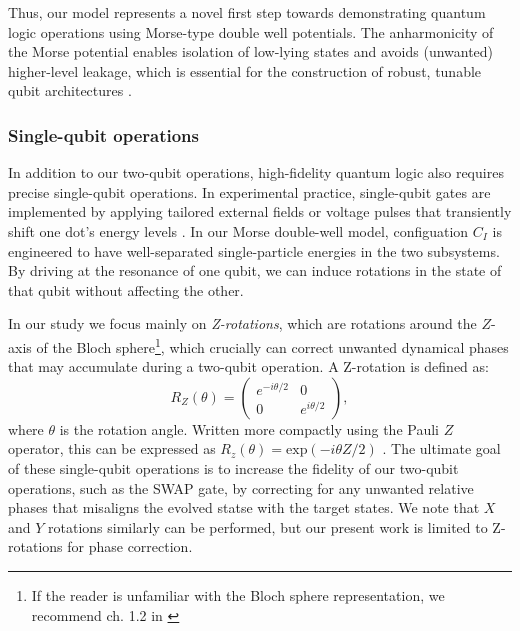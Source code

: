 \documentclass{subfiles}
\begin{document}
Thus, our model represents a novel first step towards demonstrating quantum logic operations using Morse-type double well potentials. The anharmonicity of the Morse potential enables isolation of low-lying states and avoids (unwanted) higher-level leakage, which is essential for the construction of robust, tunable qubit architectures \cite{nielsen2010quantum}.

\subsubsection*{Single-qubit operations}
In addition to our two-qubit operations, high-fidelity quantum logic also requires precise single-qubit operations.  In experimental practice, single-qubit gates are implemented by applying tailored external fields or voltage pulses that transiently shift one dot's energy levels \cite{mcdermott2014accurate}. In our Morse double-well model, configuation $C_I$ is engineered to have well-separated single-particle energies in the two subsystems. By driving at the resonance of one qubit, we can induce rotations in the state of that qubit without affecting the other. 

In our study we focus mainly on \emph{Z-rotations}, which are rotations around the $Z$-axis of the Bloch sphere\footnote{If the reader is unfamiliar with the Bloch sphere representation, we recommend ch. 1.2 in \cite{nielsen2010quantum}}, which crucially can correct unwanted dynamical phases that may accumulate during a two-qubit operation. A Z-rotation is defined as:
\begin{equation}
    R_Z(\theta) = \begin{pmatrix}
    e^{-i\theta/2} & 0 \\
    0 & e^{i\theta/2}
    \end{pmatrix} \label{eq:z_rotation_gate},
\end{equation}
where $\theta$ is the rotation angle. Written more compactly using the Pauli $Z$ operator, this can be expressed as $R_z(\theta) = \text{exp}(-i\theta Z/2)$ \cite{nielsen2010quantum}. The ultimate goal of these single-qubit operations is to increase the fidelity of our two-qubit operations, such as the SWAP gate, by correcting for any unwanted relative phases that misaligns the evolved statse with the target states. We note that $X$ and $Y$ rotations similarly can be performed, but our present work is limited to Z-rotations for phase correction.
\end{document}
